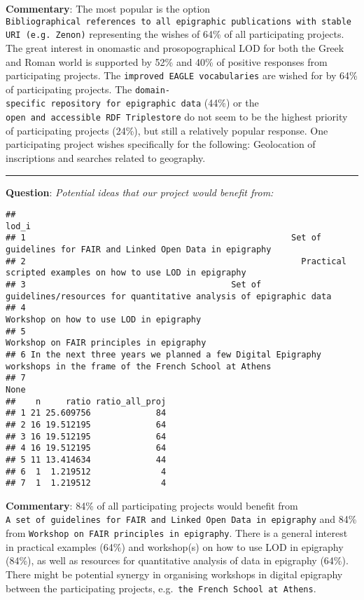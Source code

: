 \documentclass[
]{article}
\begin{document}
\textbf{Commentary}: The most popular is the option
\texttt{Bibliographical\ references\ to\ all\ epigraphic\ publications\ with\ stable\ URI\ (e.g.\ Zenon)}
representing the wishes of 64\% of all participating projects. The great
interest in onomastic and prosopographical LOD for both the Greek and
Roman world is supported by 52\% and 40\% of positive responses from
participating projects. The \texttt{improved\ EAGLE\ vocabularies} are
wished for by 64\% of participating projects. The
\texttt{domain-specific\ repository\ for\ epigraphic\ data} (44\%) or
the \texttt{open\ and\ accessible\ RDF\ Triplestore} do not seem to be
the highest priority of participating projects (24\%), but still a
relatively popular response. One participating project wishes
specifically for the following: Geolocation of inscriptions and searches
related to geography.

\begin{center}\rule{0.5\linewidth}{0.5pt}\end{center}

\textbf{Question}: \emph{Potential ideas that our project would benefit
from:}

\begin{verbatim}
##                                                                                                              lod_i
## 1                                                     Set of guidelines for FAIR and Linked Open Data in epigraphy
## 2                                                       Practical scripted examples on how to use LOD in epigraphy
## 3                                         Set of guidelines/resources for quantitative analysis of epigraphic data
## 4                                                                          Workshop on how to use LOD in epigraphy
## 5                                                                         Workshop on FAIR principles in epigraphy
## 6 In the next three years we planned a few Digital Epigraphy workshops in the frame of the French School at Athens
## 7                                                                                                             None
##    n     ratio ratio_all_proj
## 1 21 25.609756             84
## 2 16 19.512195             64
## 3 16 19.512195             64
## 4 16 19.512195             64
## 5 11 13.414634             44
## 6  1  1.219512              4
## 7  1  1.219512              4
\end{verbatim}

\textbf{Commentary}: 84\% of all participating projects would benefit
from
\texttt{A\ set\ of\ guidelines\ for\ FAIR\ and\ Linked\ Open\ Data\ in\ epigraphy}
and 84\% from \texttt{Workshop\ on\ FAIR\ principles\ in\ epigraphy}.
There is a general interest in practical examples (64\%) and workshop(s)
on how to use LOD in epigraphy (84\%), as well as resources for
quantitative analysis of data in epigraphy (64\%). There might be
potential synergy in organising workshops in digital epigraphy between
the participating projects,
e.g.~\texttt{the\ French\ School\ at\ Athens}.
\end{document}
